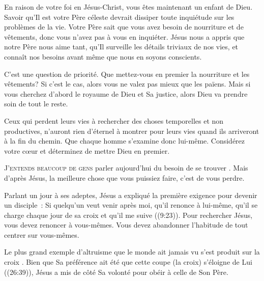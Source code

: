 En raison de votre foi en Jésus-Christ, vous êtes maintenant un enfant
 de Dieu. Savoir qu'Il est votre Père  céleste devrait dissiper
 toute inquiétude sur les problèmes de la vie. Votre Père sait que vous avez
 besoin de nourriture et de vêtements, donc vous n'avez pas à vous en
 inquiéter. Jésus nous a appris que notre Père nous aime tant,
 qu'Il surveille les détails triviaux de nos vies,
 et connaît nos besoins avant même que nous en soyons conscients. 

C'est une question de priorité. Que mettez-vous en premier
 \ocadr la nourriture et les vêtements? Si c'est le cas,
 alors vous ne valez pas mieux que les païens.
 Mais si vous cherchez d'abord le royaume de Dieu et Sa justice,
 alors Dieu va prendre soin de tout le reste. 


Ceux qui perdent leurs vies à rechercher des choses temporelles
 et non productives, n'auront rien d'éternel à montrer pour leurs vies
 quand ils arriveront à la fin du chemin. Que chaque homme
 s'examine donc lui-même. Considérez votre cœur et déterminez
 de mettre Dieu en premier. 

\dvrule






\lettrine{J}{'entends beaucoup de gens} parler aujourd'hui du besoin
 de \og se trouver \fg{}. Mais d'après Jésus, la meilleure chose
 que vous puissiez faire, c'est de vous perdre. 

Parlant un jour à ses adeptes, Jésus a expliqué la première exigence
 pour devenir un disciple~: \og Si quelqu'un veut venir après moi,
 qu'il renonce à lui-même, qu'il se charge chaque jour de sa croix
 et qu'il me suive \fg{} ((9:23)).
 Pour rechercher Jésus, vous devez renoncer à vous-mêmes.
 Vous devez abandonner l'habitude de tout centrer sur vous-mêmes. 

Le plus grand exemple d'altruisme que le monde ait jamais vu
 s'est produit sur la croix . Bien que Sa préférence ait été
 que cette coupe (la croix) s'éloigne de Lui ((26:39)),
 Jésus a mis de côté Sa volonté pour obéir à celle de Son Père. 

